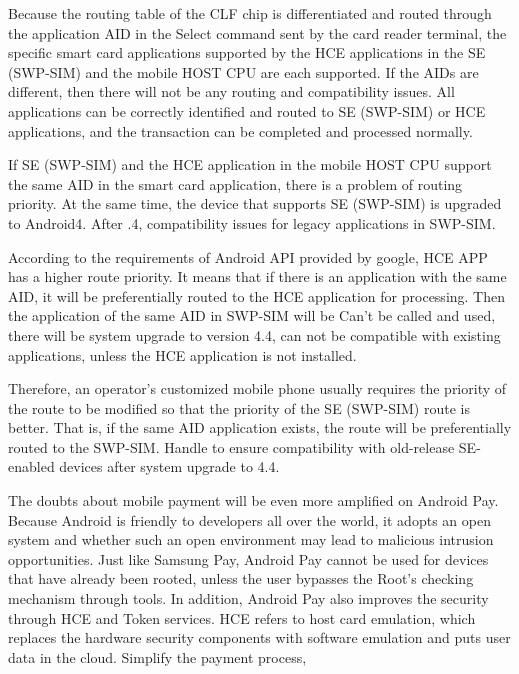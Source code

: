 \documentclass[journal]{IEEEtran}
\begin{document}
Because the routing table of the CLF chip is differentiated and routed through the application AID in the Select command sent by the card reader terminal, the specific smart card applications supported by the HCE applications in the SE (SWP-SIM) and the mobile HOST CPU are each supported. If the AIDs are different, then there will not be any routing and compatibility issues. All applications can be correctly identified and routed to SE (SWP-SIM) or HCE applications, and the transaction can be completed and processed normally.

If SE (SWP-SIM) and the HCE application in the mobile HOST CPU support the same AID in the smart card application, there is a problem of routing priority. At the same time, the device that supports SE (SWP-SIM) is upgraded to Android4. After .4, compatibility issues for legacy applications in SWP-SIM.

According to the requirements of Android API provided by google, HCE APP has a higher route priority. It means that if there is an application with the same AID, it will be preferentially routed to the HCE application for processing. Then the application of the same AID in SWP-SIM will be Can't be called and used, there will be system upgrade to version 4.4, can not be compatible with existing applications, unless the HCE application is not installed.

Therefore, an operator's customized mobile phone usually requires the priority of the route to be modified so that the priority of the SE (SWP-SIM) route is better. That is, if the same AID application exists, the route will be preferentially routed to the SWP-SIM. Handle to ensure compatibility with old-release SE-enabled devices after system upgrade to 4.4.


The doubts about mobile payment will be even more amplified on Android Pay. Because Android is friendly to developers all over the world, it adopts an open system and whether such an open environment may lead to malicious intrusion opportunities. Just like Samsung Pay, Android Pay cannot be used for devices that have already been rooted, unless the user bypasses the Root's checking mechanism through tools. In addition, Android Pay also improves the security through HCE and Token services. HCE refers to host card emulation, which replaces the hardware security components with software emulation and puts user data in the cloud. Simplify the payment process,
\end{document}
